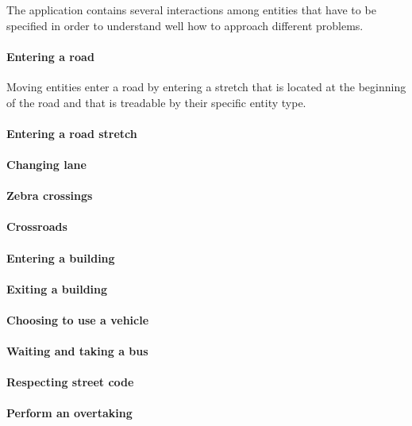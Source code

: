 
The application contains several interactions among entities that have to be
specified in order to understand well how to approach different problems.

\paragraph{Entering a road} Moving entities enter a road by entering a stretch
that is located at the beginning of the road and that is treadable by their
specific entity type.

\paragraph{Entering a road stretch}

\paragraph{Changing lane}

\paragraph{Zebra crossings}

\paragraph{Crossroads}

\paragraph{Entering a building}

\paragraph{Exiting a building}

\paragraph{Choosing to use a vehicle}

\paragraph{Waiting and taking a bus}

\paragraph{Respecting street code}

\paragraph{Perform an overtaking}


